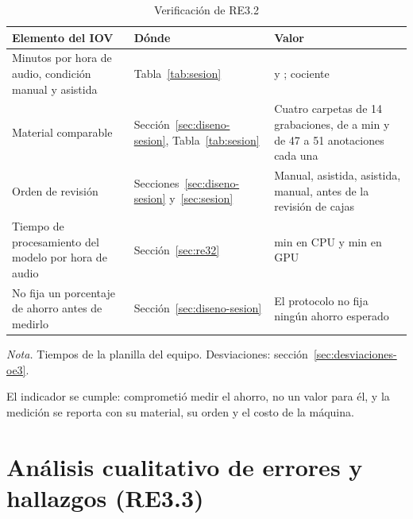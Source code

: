 \begin{table}[htbp]
    \centering
    \small
    \begin{threeparttable}
        \caption{Verificación de RE3.2}
        \label{tab:verificacion-re32}
        \begin{tabular}{@{}L{4.6cm}L{3.4cm}L{5.3cm}@{}}
            \toprule
            \textbf{Elemento del IOV} & \textbf{Dónde} & \textbf{Valor} \\
            \midrule
            Minutos por hora de audio, condición manual y asistida & Tabla~\ref{tab:sesion} & \uMinManual{} y \uMinAssisted{}; cociente \uTimeRatio{} \\
            Material comparable & Sección~\ref{sec:diseno-sesion}, Tabla~\ref{tab:sesion} & Cuatro carpetas de 14 grabaciones, de \uFolderAudioLow{} a \uFolderAudioHigh{} min y de 47 a 51 anotaciones cada una \\
            Orden de revisión & Secciones~\ref{sec:diseno-sesion} y~\ref{sec:sesion} & Manual, asistida, asistida, manual, antes de la revisión de cajas \\
            Tiempo de procesamiento del modelo por hora de audio & Sección~\ref{sec:re32} & \uCpuMinPerHour{} min en CPU y \uGpuMinPerHour{} min en GPU \\
            No fija un porcentaje de ahorro antes de medirlo & Sección~\ref{sec:diseno-sesion} & El protocolo no fija ningún ahorro esperado \\
            \bottomrule
        \end{tabular}
        \begin{tablenotes}[flushleft]
            \footnotesize
            \item \textit{Nota.} Tiempos de la planilla del equipo. Desviaciones:
            sección~\ref{sec:desviaciones-oe3}.
        \end{tablenotes}
    \end{threeparttable}
\end{table}

El indicador se cumple: comprometió medir el ahorro, no un valor para él, y la
medición se reporta con su material, su orden y el costo de la máquina.

\section{Análisis cualitativo de errores y hallazgos (RE3.3)}
\label{sec:re33}

